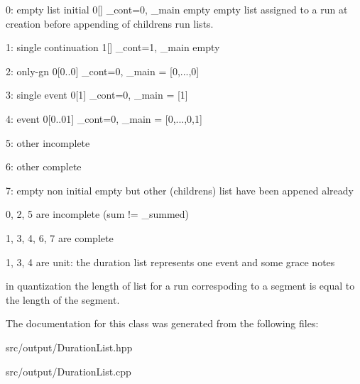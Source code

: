 \begin{DoxyItemize}
\item 0\+: empty list initial 0\mbox{[}\mbox{]} \+\_\+cont=0, \+\_\+main empty empty list assigned to a run at creation before appending of children\textquotesingle{}s run lists.
\item 1\+: single continuation 1\mbox{[}\mbox{]} \+\_\+cont=1, \+\_\+main empty
\item 2\+: only-\/gn 0\mbox{[}0..0\mbox{]} \+\_\+cont=0, \+\_\+main = \mbox{[}0,...,0\mbox{]}
\item 3\+: single event 0\mbox{[}1\mbox{]} \+\_\+cont=0, \+\_\+main = \mbox{[}1\mbox{]}
\item 4\+: event 0\mbox{[}0..01\mbox{]} \+\_\+cont=0, \+\_\+main = \mbox{[}0,...,0,1\mbox{]}
\item 5\+: other incomplete
\item 6\+: other complete
\item 7\+: empty non initial empty but other (children\textquotesingle{}s) list have been appened already
\item 0, 2, 5 are incomplete (sum != \+\_\+summed)
\item 1, 3, 4, 6, 7 are complete
\item 1, 3, 4 are unit\+: the duration list represents one event and some grace notes
\end{DoxyItemize}

in quantization the length of list for a run correspoding to a segment is equal to the length of the segment. 

The documentation for this class was generated from the following files\+:\begin{DoxyCompactItemize}
\item 
src/output/Duration\+List.\+hpp\item 
src/output/Duration\+List.\+cpp\end{DoxyCompactItemize}
